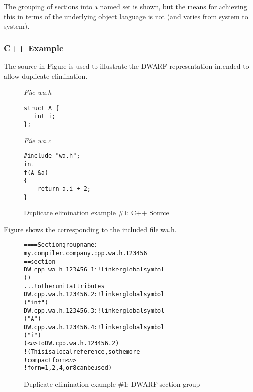 The grouping of sections into a named set is shown, but the means for achieving this in terms of
the underlying object language is not (and varies from system to system).

\subsubsection{C++ Example}

The  source 
in 
Figure 
is used to illustrate the DWARF
representation intended to allow duplicate elimination.

\begin{figure}[ht]
\textit{File wa.h}
\begin{lstlisting}[numbers=none]
struct A {
   int i;
};
\end{lstlisting}
\textit{File wa.c}
\begin{lstlisting}[numbers=none]
#include "wa.h";
int
f(A &a)
{
    return a.i + 2;
}
\end{lstlisting}
\caption{Duplicate elimination example \#1: C++ Source}
\label{fig:duplicateeliminationexample1csource}
\end{figure}

Figure 
shows the  corresponding to the included file 
wa.h.

\begin{figure}
\begin{dwflisting}
\begin{alltt}
==== Section group name:
    my.compiler.company.cpp.wa.h.123456
== section \dotdebuginfo{}
DW.cpp.wa.h.123456.1:     ! linker global symbol
    \DWTAGcompileunit
        \DWATlanguage(\DWLANGCplusplus)
        ...  ! other unit attributes
DW.cpp.wa.h.123456.2:     ! linker global symbol
    \DWTAGbasetype
        \DWATname("int")
DW.cpp.wa.h.123456.3:     ! linker global symbol
    \DWTAGstructuretype
        \DWATname("A")
DW.cpp.wa.h.123456.4:     ! linker global symbol
        \DWTAGmember
        \DWATname("i")
        \DWATtype(\DWFORMref\textit{<n>} to DW.cpp.wa.h.123456.2)
            ! (This is a local reference, so the more
            ! compact form \DWFORMref\textit{<n>} 
            ! for n = 1,2,4, or 8 can be used)
\end{alltt}
\end{dwflisting}
\vspace{2mm}
\caption{Duplicate elimination example \#1: DWARF section group} 
\label{fig:duplicateeliminationexample1dwarfsectiongroup}
\end{figure}

